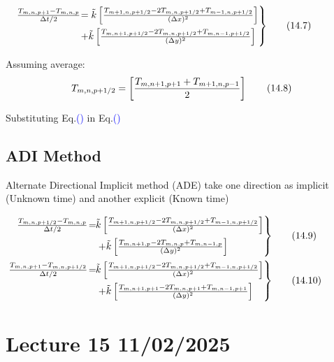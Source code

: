 \documentclass[fleqn,10pt]{SelfArx} %
\newcommand{\myeqref}[1]{Eq.\textcolor{blue}{\textup{(\getrefnumber{#1})}}}
\begin{document}
\begin{align*}
\mspace{-49mu}
	\begin{rcases}
		\frac{T_{m,n,p+1} - T_{m,n,p}}{\Delta t/2} \mspace{-17mu} &= \tilde{k}\left[\frac{T_{m+1,n,p+1/2} - 2T_{m,n,p+1/2} + T_{m-1,n,p+1/2}}{(\Delta x)^2}\right] \\ & + \tilde{k}\left[\frac{T_{m,n+1,p+1/2} - 2T_{m,n,p+1/2} + T_{m,n-1,p+1/2}}{(\Delta y)^2}\right]
	\end{rcases} & \tag{14.7} \label{eq:14.7}
\end{align*}

Assuming average:
\begin{align*}
	T_{\smash{m,n,p+1/2}} = \left[\frac{T_{\smash{m,n+1,p+1}} + T_{\smash{m+1,n,p-1}}}{2}\right] \tag{14.8} \label{eq:14.8}
\end{align*}

Substituting \myeqref{eq:14.8} in \myeqref{eq:14.6}

\subsection{ADI Method}
Alternate Directional Implicit method (ADE) take one direction as implicit (Unknown time) and another explicit (Known time)

\begin{align*}
	\begin{rcases}
		\mspace{-45mu} \frac{T_{\smash{m,n,p+1/2}} - T_{m,n,p}}{\Delta t/2} \mspace{-16mu} &= \!\! \tilde{k}\left[\frac{T_{m+1,n,p+1/2} - 2T_{m,n,p+1/2} + T_{m-1,n,p+1/2}}{(\Delta x)^2}\right] \\ &\quad + \tilde{k}\left[\frac{T_{m,n+1,p} - 2T_{m,n,p} + T_{m,n-1,p}}{(\Delta y)^2}\right]
	\end{rcases} & \tag{14.9} \label{eq:14.9} \\
	\begin{rcases}
		\mspace{-45mu} \frac{T_{\smash{m,n,p+1}} - T_{m,n,p+1/2}}{\Delta t/2} \mspace{-16mu} &= \!\! \tilde{k}\left[\frac{T_{m+1,n,p+1/2} - 2T_{m,n,p+1/2} + T_{m-1,n,p+1/2}}{(\Delta x)^2}\right] \\ &\quad + \tilde{k}\left[\frac{T_{m,n+1,p+1} - 2T_{m,n,p+1} + T_{m,n-1,p+1}}{(\Delta y)^2}\right]
	\end{rcases} & \tag{14.10} \label{eq:14.10}
\end{align*}

\clearpage

\section{Lecture 15 11/02/2025}
\end{document}
